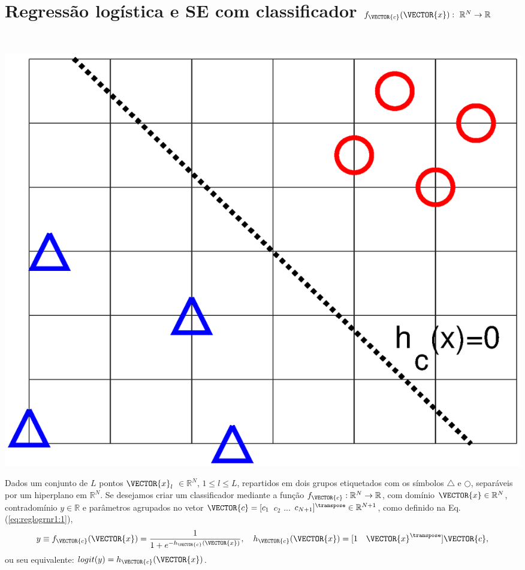 \newpage

\section{Regressão logística e SE com classificador $f_{\VECTOR{c}}(\VECTOR{x}):~\mathbb{R}^{N} \rightarrow \mathbb{R}$}
\label{sec:theo:reglogrnr1:1}




\begin{theorem}\label{theo:reglogrnr1:1}
~\\
\noindent
\begin{minipage}{0.45\textwidth}
\centering
\includegraphics[width=0.95\linewidth]{chapters/classificacao/mfiles/reglogrnr1/reglogrnr1.eps} 
\end{minipage}
\begin{minipage}{0.55\textwidth}
Dados um conjunto de $L$ pontos
$\VECTOR{x}_l$ $\in \mathbb{R}^{N}$, $1\leq l \leq L$,
repartidos em dois grupos etiquetados com os símbolos $\bigtriangleup$ e $\bigcirc$,
separáveis por um hiperplano  em $\mathbb{R}^{N}$.
Se desejamos criar um classificador mediante 
a função  $f_{\VECTOR{c}}:\mathbb{R}^{N} \rightarrow \mathbb{R}$,
com domínio $\VECTOR{x} \in \mathbb{R}^{N}$, contradomínio $y \in \mathbb{R}$ e 
parâmetros agrupados no vetor $\VECTOR{c}=[c_1$ $c_2$ $...$ $c_{N+1}]^{\transpose}\in \mathbb{R}^{N+1}$,
como definido na Eq. (\ref{eq:reglogrnr1:1}),
\begin{equation}\label{eq:reglogrnr1:1}
y\equiv f_{\VECTOR{c}}(\VECTOR{x})= \frac{1}{1+e^{-h_{\VECTOR{c}}(\VECTOR{x})}},
\quad h_{\VECTOR{c}}(\VECTOR{x})=[1\quad \VECTOR{x}^{\transpose}] \VECTOR{c},
\end{equation}
ou seu equivalente: $logit(y)=h_{\VECTOR{c}}(\VECTOR{x})$.
\end{minipage}


\end{theorem}
